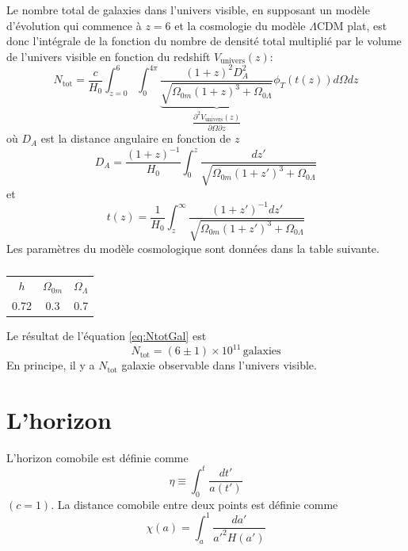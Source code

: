 \documentclass{article}
\numberwithin{equation}{section}
\begin{document}
Le nombre total de galaxies dans l'univers visible, 
en supposant un modèle d'évolution
qui commence à $z = 6$ et la cosmologie du modèle $\Lambda \text{CDM}$ plat, est 
donc l'intégrale de la fonction du nombre de densité total multiplié par 
le volume de l'univers visible en fonction du redshift $V_{\text{univers}}(z)$:
\begin{equation}\label{eq:NtotGal} 
        N_{\text{tot}} = \frac{c}{H_0} \int_{z=0}^{6} 
        \int_0^{4 \pi} 
        \underbrace{\frac{(1 + z)^{2} D_A^{2}}{
        \sqrt{\Omega_{0m}(1 + z)^{3} + \Omega_{0\Lambda}}}}_{
\dfrac{\partial^{2} V_{\text{univers}}(z)}{\partial \Omega \partial z}}
        \phi_T(t(z)) d\Omega dz
\end{equation} 
où $D_A$ est la distance angulaire en fonction de $z$
\begin{equation}\label{eq:DA} 
        D_A =  \frac{(1 + z)^{-1}}{H_0}\int_0^{z} \frac{dz'}{\sqrt{\Omega_{0m}(1 + z')^{3} 
        + \Omega_{0\Lambda}}}
\end{equation} 
et
\begin{equation}\label{eq:t(z)} 
        t(z) = \frac{1}{H_0}\int_z^{\infty } \frac{(1 + z')^{-1} dz'}{
        \sqrt{\Omega_{0m}(1 + z')^{3} + \Omega_{0\Lambda}}}
\end{equation} 
Les paramètres du modèle cosmologique sont données dans la table suivante.
\begin{table}[H]
        \centering
        \begin{tabular}{ccc}
                \toprule
                $h$ & $\Omega_{0m}$ & $\Omega_\Lambda$ \\
                0.72 & 0.3 & 0.7 \\
                \bottomrule
                
        \end{tabular}
        \caption{}
        \label{tab:}
\end{table}
Le résultat de l'équation \eqref{eq:NtotGal} est 
\[
        \boxed{N_{\text{tot}} = (6 \pm 1) \times 10^{11}\, \text{galaxies}}
\]
En principe, il y a $N_{\text{tot}}$ galaxie observable dans l'univers visible.


\section{L'horizon}
L'horizon comobile est définie comme
\[
        \eta \equiv \int_0^t \frac{dt'}{a(t')}
\]
$(c = 1)$. La distance comobile entre deux points est définie comme
\[
        \chi(a) = \int_a^{1} \frac{da'}{a'^2 H(a')}
\]
\end{document}
